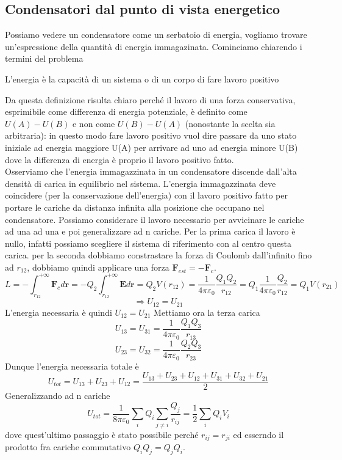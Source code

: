 \documentclass[
10pt, %
a4paper, %
oneside, %
headinclude,footinclude, %
BCOR5mm, %
]{scrartcl}
\begin{document}
\subsection{Condensatori dal punto di vista energetico}
Possiamo vedere un condensatore come un serbatoio di energia, vogliamo trovare un'espressione della quantità di energia immagazinata. Cominciamo chiarendo i termini del problema
\begin{definizione}[Energia]
L'energia è la capacità di un sistema o di un corpo di fare lavoro positivo
\end{definizione}
Da questa definizione risulta chiaro perché il lavoro di una forza conservativa, esprimibile come differenza di energia potenziale, è definito come \(U(A)-U(B)\) e non come \(U(B)-U(A)\) (nonostante la scelta sia arbitraria): in questo modo fare lavoro positivo vuol dire passare da uno stato iniziale ad energia maggiore U(A) per arrivare ad uno ad energia minore U(B) dove la differenza di energia è proprio il lavoro positivo fatto.\\
Osserviamo che l'energia immagazzinata in un condensatore discende dall'alta densità di carica in equilibrio nel sistema. L'energia immagazzinata deve coincidere (per la conservazione dell'energia) con il lavoro positivo fatto per portare le cariche da distanza infinita alla posizione che occupano nel condensatore. Possiamo considerare il lavoro necessario per avvicinare le cariche ad una ad una e poi generalizzare ad n cariche. Per la prima carica il lavoro è nullo, infatti possiamo scegliere il sistema di riferimento con al centro questa carica. per la seconda dobbiamo constrastare la forza di Coulomb dall'infinito fino ad \(r_{12}\), dobbiamo quindi applicare una forza $\mathbf{F}_{est} = -\mathbf{F}_{c}$.
\[L = -\int_{r_12}^{+\infty}\mathbf{F}_{c}d\mathbf{r} = -Q_2\int_{r_12}^{+\infty}\mathbf{E}d\mathbf{r} = Q_2V(r_{12}) = \frac{1}{4\pi\varepsilon_0}\frac{Q_1 Q_2}{r_{12}} = Q_1\frac{1}{4\pi\varepsilon_0}\frac{ Q_2}{r_{12}} = Q_1V(r_{21}) \]
\[\Rightarrow U_{12} = U_{21}\]
L'energia necessaria è quindi \(U_{12} = U_{21}\) 
Mettiamo ora la terza carica 
\[U_{13} = U_{31} = \frac{1}{4\pi\varepsilon_0}\frac{Q_1 Q_3}{r_{13}}\]
\[U_{23} = U_{32} = \frac{1}{4\pi\varepsilon_0}\frac{Q_2 Q_3}{r_{23}}\]
Dunque l'energia necessaria totale è 
\[U_{tot} =U_{13} + U_{23} + U_{12}  = \frac{U_{13} + U_{23} + U_{12} + U_{31} + U_{32} + U_{21}}{2}\]
Generalizzando ad n cariche
\[U_{tot} =\frac{1}{8\pi\varepsilon_0} \sum_i Q_i\sum_{j\neq i} \frac{Q_j}{r_{ij}} = \frac{1}{2}\sum_i Q_i V_i\]
dove quest'ultimo passaggio è stato possibile perché \(r_{ij} = r_{ji}\) ed esserndo il prodotto fra cariche commutativo \(Q_iQ_j = Q_jQ_i\).\\
\end{document}
